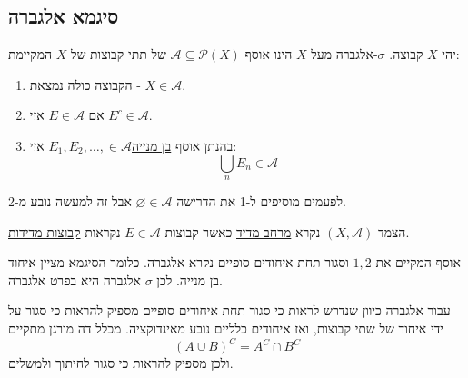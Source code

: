 \documentclass{tstextbook}
\begin{document}
\subsection{סיגמא אלגברה}

\begin{definition}
יהי \(X\) קבוצה. \(\sigma\)-אלגברה מעל \(X\) הינו אוסף \(\mathcal{A}\subseteq \mathcal{P}(X)\) של תתי קבוצות של \(X\) המקיימת:

  \begin{enumerate}
    \item הקבוצה כולה נמצאת - \(X \in \mathcal{A}\). 


    \item אם \(E \in \mathcal{A}\) אזי \(E^{c} \in \mathcal{A}\). 


    \item בהנתן אוסף \underline{בן מנייה}\(E_{1}, E_{2},\dots, \in \mathcal{A}\) אזי: 
$$\bigcup_{n}E_{n}\in \mathcal{A}$$


  \end{enumerate}
\end{definition}
\begin{remark}
לפעמים מוסיפים ל-1 את הדרישה \(\varnothing \in \mathcal{A}\) אבל זה למעשה נובע מ-2.

\end{remark}
\begin{definition}
הצמד \((X,\mathcal{A})\) נקרא \underline{מרחב מדיד} כאשר קבוצות \(E \in \mathcal{A}\) נקראות \underline{קבוצות מדידות}.

\end{definition}
\begin{definition}[אלגברה]
אוסף המקיים את \(1,2\) וסגור תחת איחודים סופיים נקרא אלגברה. כלומר הסיגמא מציין איחוד בן מנייה. לכן \(\sigma\) אלגברה היא בפרט אלגברה.

\end{definition}
\begin{remark}
עבור אלגברה כיוון שנדרש לראות כי סגור תחת איחודים סופיים מספיק להראות כי סגור על ידי איחוד של שתי קבוצות, ואז איחודים כלליים נובע מאינדוקציה. מכלל דה מורגן מתקיים
$$\left( A\cup B \right)^{C}=A^{C}\cap B^{C}$$
ולכן מספיק להראות כי סגור לחיתוך ולמשלים.

\end{remark}
\end{document}

